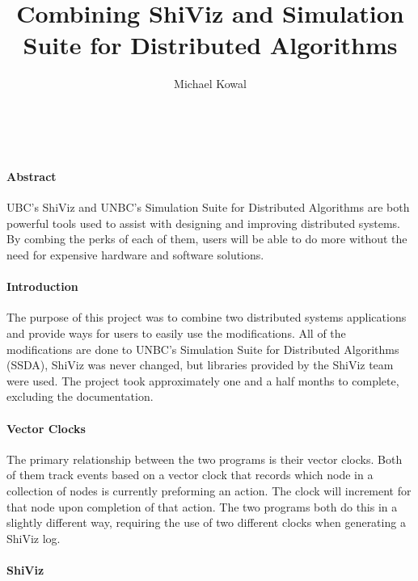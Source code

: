 \documentclass[12pt, oneside]{article}   	%
\title{Combining ShiViz and Simulation Suite for Distributed Algorithms}
\author{Michael Kowal}
\date{}
\begin{document}
\maketitle\ 
\paragraph{Abstract}

UBC's ShiViz and UNBC's Simulation Suite for Distributed Algorithms are both powerful tools used to assist with designing and improving distributed systems.  By combing the perks of each of them, users will be able to do more without the need for expensive hardware and software solutions.

\paragraph{Introduction}

The purpose of this project was to combine two distributed systems applications and provide ways for users to easily use the modifications.  All of the modifications are done to UNBC's Simulation Suite for Distributed Algorithms (SSDA), ShiViz was never changed, but libraries provided by the ShiViz team were used.  The project took approximately one and a half months to complete, excluding the documentation.  

\paragraph{Vector Clocks}

The primary relationship between the two programs is their vector clocks.  Both of them track events based on a vector clock that records which node in a collection of nodes is currently preforming an action.  The clock will increment for that node upon completion of that action.  The two programs both do this in a slightly different way, requiring the use of two different clocks when generating a ShiViz log.

\paragraph{ShiViz}
\end{document}
